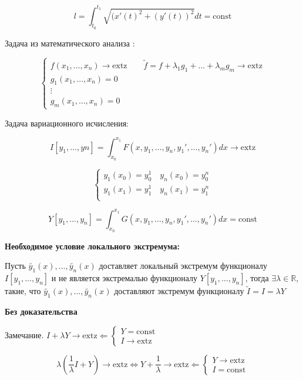 \documentclass[12pt, a4paper]{report}
\begin{document}
\[ l = \int_{t_0 }^{t_1} \sqrt{(x' (t ) ^2 + (y '(t ) )^2 } dt = \mathrm{const}   \] 

Задача из математического анализа : 

\[ \begin{cases}
f(x_1, \ldots, x_n ) \to  \mathrm{extz}   \quad \quad  \tilde{f } =f + \lambda_1 g_1 + ... + \lambda_m g_m \to  \mathrm{extz}   \\
g_1 (x_1, \ldots, x_n ) = 0 \\
\vdots \\
g_m (x_1, \ldots, x_n ) = 0
\end{cases} \] 

Задача вариационного исчисления: 

\[ I[y_1, \ldots, yn] = \int_{x_0 }^{x_1 } F(x,y_1, \ldots, y_n,y_1',..., y_n') dx \to  \mathrm{extz}   \] 

\[ \begin{cases}
y_1(x_0 ) = y_0 ^1 \quad  y_n(x_0 ) = y_0 ^n \\
y_1(x_1 ) = y_1 ^1 \quad  y_n(x_1 ) = y_1 ^n \\
\end{cases} \] 

\[ Y[y_1, \ldots, y_n ] = \int_{x_0 }^{x_1} G(x,y_1, \ldots, y_n,y_1',..., y_n')dx = \mathrm{const}    \] 

\textbf{Необходимое условие локального экстремума:} 

Пусть \( \tilde{y_1 }(x ),..., \tilde{y_n}(x) \) доставляет локальный экстремум функционалу \( I[y_1, \ldots, y_n] \)  и не является экстремалью функционалу \( Y[y_1, \ldots, y_n] \), тогда \( \exists  \lambda \in  \mathbb{R} \), такие, что \( \tilde{y_1}(x),..., \tilde{y_n}(x) \) доставляют экстремум функционалу \( \tilde{I } = I = \lambda Y \) 

\textbf{Без доказательства}

Замечание. \( I + \lambda Y \to  \mathrm{extz}  \Leftarrow \begin{cases}
    Y   = \mathrm{const}  \\
    I\to  \mathrm{extz} 
    \end{cases}  \) 

\[ \lambda \left( \frac{1}{\lambda }I + Y   \right) \to  \mathrm{extz} \Leftrightarrow Y+ \frac{1}{\lambda } \to  \mathrm{extz}  \Leftarrow \begin{cases}
Y \to  \mathrm{extz}  \\
I = \mathrm{const}  
\end{cases} \] 
\end{document}
